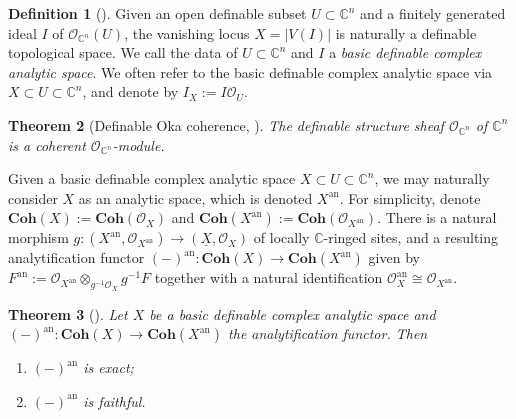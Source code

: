 \documentclass{amsart}
\newtheorem{theorem}{Theorem}[section]
\theoremstyle{definition}
\newtheorem{definition}[theorem]{Definition}
\numberwithin{equation}{section}
\newcommand{\analytic}{\mathrm{an}}
\begin{document}
\begin{definition}[{\cite[Definition 2.19]{zbMATH07662555}}]
    Given an open definable subset $U \subset \mathbb{C}^n$ and 
    a finitely generated ideal $I$ of $\mathcal{O}_{\mathbb{C}^n}(U)$,
    the vanishing locus $X = |V(I)|$ is naturally a definable topological space.
    We call the data of $U \subset \mathbb{C}^n$ and $I$ a \emph{basic definable complex analytic space}.
    We often refer to the basic definable complex analytic space via $X \subset U \subset \mathbb{C}^n$,
    and denote by $I_X := I\mathcal{O}_U$.
\end{definition}

\begin{theorem}[{Definable Oka coherence, \cite[Theorem 2.21]{zbMATH07662555}}]
    The definable structure sheaf $\mathcal{O}_{\mathbb{C}^n}$ of $\mathbb{C}^n$ is a coherent $\mathcal{O}_{\mathbb{C}^n}$-module.
\end{theorem}

Given a basic definable complex analytic space $X \subset U \subset \mathbb{C}^n$,
we may naturally consider $X$ as an analytic space,
which is denoted $X^{\analytic}$.
For simplicity, denote $\mathbf{Coh}(X) := \mathbf{Coh}(\mathcal{O}_X)$ and $\mathbf{Coh}(X^{\analytic}) := \mathbf{Coh}(\mathcal{O}_{X^{\analytic}})$.
There is a natural morphism $g: (X^{\analytic},\mathcal{O}_{X^{\analytic}}) \to (\underline{X},\mathcal{O}_X)$ of locally $\mathbb{C}$-ringed sites,
and a resulting analytification functor $(-)^{\analytic}: \mathbf{Coh}(X) \to \mathbf{Coh}(X^{\analytic})$ given by $F^{\analytic} := \mathcal{O}_{X^{\analytic}} \otimes_{g^{-1}\mathcal{O}_X} g^{-1}F$ together with a natural identification $\mathcal{O}_X^{\analytic} \cong \mathcal{O}_{X^{\analytic}}$.

\begin{theorem}[{\cite[Theorem 2.27]{zbMATH07662555}}]
    Let $X$ be a basic definable complex analytic space and $(-)^{\analytic} : \mathbf{Coh}(X) \to \mathbf{Coh}(X^{\analytic})$ the analytification functor. Then
    \begin{enumerate}[label = {(\arabic*)}]
        \item $(-)^{\analytic}$ is exact;
        \item $(-)^{\analytic}$ is faithful.
    \end{enumerate}
\end{theorem}
\end{document}
